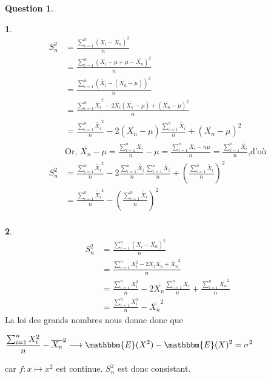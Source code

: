 \documentclass[12pt]{article}
\newcommand{\1}{\mathbbm{1}}
\newcommand{\E}{\mathbbm{E}}
\newcommand{\Xti}{\widetilde{X_i}}
\newcommand{\Xn}{\overline{X_n}}
\theoremstyle{definition}\newtheorem{defn}{Définition}
\theoremstyle{definition}\newtheorem{exm}{Exemple}
\theoremstyle{definition}\newtheorem{rem}{Remarque}
\theoremstyle{definition}\newtheorem{algo}{Algorithme}
\theoremstyle{remark}\newtheorem{exo}{Exercice}
\theoremstyle{remark}\newtheorem{nota}{Notation}
\theoremstyle{definition}\newtheorem{1q}{Question}
\theoremstyle{definition}\newtheorem{2q}{Question}
\theoremstyle{definition}\newtheorem{3q}{Question}
\theoremstyle{definition}\newtheorem{4q}{Question}
\theoremstyle{definition}\newtheorem{2qs1}{}
\theoremstyle{definition}\newtheorem{2qs2}{}
\theoremstyle{definition}\newtheorem{2qs3}{}
\theoremstyle{definition}\newtheorem{2qs4}{}
\theoremstyle{definition}\newtheorem{4qs2}{}
\theoremstyle{definition}\newtheorem{4qs3}{}
\begin{document}
\begin{4q}

\begin{4qs3}
\begin{align*}
S_n^2 &= \displaystyle\frac{\sum_{i=1}^n(X_i -\Xn)^2}{n}\\
&= \displaystyle\frac{\sum_{i=1}^n(X_i -\mu +\mu-\Xn)^2}{n}\\
&=\displaystyle\frac{\sum_{i=1}^n(\Xti -(\Xn-\mu))^2}{n}\\
&=\displaystyle\frac{\sum_{i=1}^n \Xti^2 - 2\Xti(\Xn-\mu)+(\Xn-\mu)^2}{n}\\
&=\displaystyle\frac{\sum_{i=1}^n \Xti^2}{n} -2(\Xn-\mu)\frac{\sum_{i=1}^n\Xti}{n}+(\Xn-\mu)^2\\
& \text{Or, $\Xn - \mu = \frac{\sum_{i=1}^n X_i}{n}-\mu = \displaystyle\frac{\sum_{i=1}^n X_i-n\mu}{n} = \frac{\sum_{i=1}^n\Xti}{n}$,d'où}\\
S_n^2 &= \displaystyle\frac{\sum_{i=1}^n \Xti^2}{n} -2\frac{\sum_{i=1}^n\Xti}{n}\frac{\sum_{i=1}^n\Xti}{n}+\left(\frac{\sum_{i=1}^n\Xti}{n}\right)^2\\
&= \displaystyle\frac{\sum_{i=1}^n \Xti^2}{n}- \left(\frac{\sum_{i=1}^n\Xti}{n}\right)^2\\
\end{align*}
\end{4qs3}

\begin{4qs3}
\begin{align*}
S_n^2 &= \displaystyle\frac{\sum_{i=1}^n(X_i -\Xn)^2}{n} \\
&=  \displaystyle\frac{\sum_{i=1}^n X_i^2 -2X_i\Xn + \Xn^2}{n}\\
&=  \displaystyle\frac{\sum_{i=1}^n X_i^2}{n}-2\Xn\frac{\sum_{i=1}^n X_i}{n}+\frac{\sum_{i=1}^n\Xn^2}{n}\\
&=   \displaystyle\frac{\sum_{i=1}^n X_i^2}{n} - \Xn^2
\end{align*}
La loi des grands nombres nous donne donc que
\begin{center}$\displaystyle\frac{\sum_{i=1}^n X_i^2}{n} - \Xn^2 \longrightarrow \E(X^2) - \E(X)^2= \sigma^2 $ \end{center}
car $f:x\longmapsto x^2$ est continue.\newline
$S_n^2$ est donc consistant.
\end{4qs3}


\end{4q}
\end{document}
